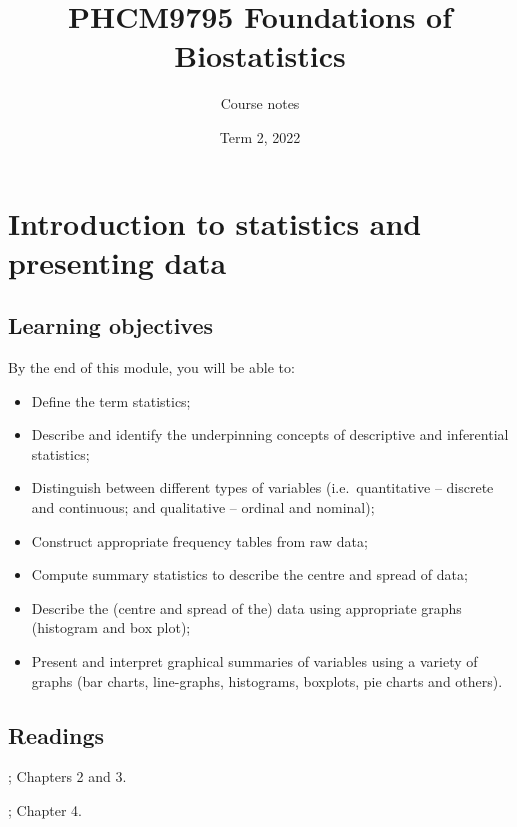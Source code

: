 \documentclass[
]{memoir}
\title{PHCM9795 Foundations of Biostatistics}
\author{Course notes}
\date{Term 2, 2022}
\providecommand{\tightlist}{%
  \setlength{\itemsep}{0pt}\setlength{\parskip}{0pt}}
\begin{document}
\maketitle

{
\setcounter{tocdepth}{1}
\tableofcontents
}
\hypertarget{introduction-to-statistics-and-presenting-data}{%
\chapter{Introduction to statistics and presenting data}\label{introduction-to-statistics-and-presenting-data}}

\hypertarget{learning-objectives}{%
\section*{Learning objectives}\label{learning-objectives}}

By the end of this module, you will be able to:

\begin{itemize}
\tightlist
\item
  Define the term statistics;
\item
  Describe and identify the underpinning concepts of descriptive and inferential statistics;
\item
  Distinguish between different types of variables (i.e.~quantitative -- discrete and continuous; and qualitative -- ordinal and nominal);
\item
  Construct appropriate frequency tables from raw data;
\item
  Compute summary statistics to describe the centre and spread of data;
\item
  Describe the (centre and spread of the) data using appropriate graphs (histogram and box plot);
\item
  Present and interpret graphical summaries of variables using a variety of graphs (bar charts, line-graphs, histograms, boxplots, pie charts and others).
\end{itemize}

\hypertarget{readings}{%
\section*{Readings}\label{readings}}

\citet{kirkwood_sterne01}; Chapters 2 and 3.

\citet{bland15}; Chapter 4.
\end{document}
